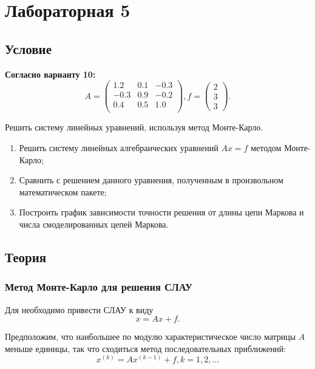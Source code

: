 \section{Лабораторная 5}

\subsection{Условие}

\textbf{Согласно варианту 10:}
\begin{equation}
	A = \begin{pmatrix}
			1.2 & 0.1 & -0.3 \\
			-0.3 & 0.9 & -0.2 \\
			0.4 & 0.5 & 1.0 \\
		\end{pmatrix},
	f = \begin{pmatrix}
			2 \\
			3 \\
			3
		\end{pmatrix}.
\end{equation}

Решить систему линейных уравнений, используя метод Монте-Карло.

\begin{enumerate}
	\item Решить систему линейных алгебраических уравнений $Ax = f$ методом Монте-Карло;
	\item Сравнить с решением данного уравнения, полученным в произвольном математическом пакете;
	\item Построить график зависимости точности решения от длины цепи Маркова и числа смоделированных цепей Маркова.
\end{enumerate}

\subsection{Теория}
\subsubsection{Метод Монте-Карло для решения СЛАУ}

Для необходимо привести СЛАУ к виду
\begin{equation}
x = Ax + f.
\end{equation}

Предположим, что наибольшее по модулю характеристическое число матрицы $A$ меньше единицы, так что сходиться метод последовательных приближений:
\begin{equation}
x^{(k)} = Ax^{(k-1)} + f, k = 1,2,\ldots
\end{equation}

